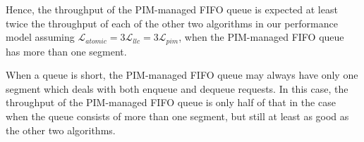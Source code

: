 \documentclass[11pt]{article}
\newcommand{\latpim} {\mathcal{L}_{pim}}
\newcommand{\latllc} {\mathcal{L}_{llc}}
\newcommand{\latato} {\mathcal{L}_{atomic}}
\begin{document}
Hence, the throughput of the PIM-managed FIFO queue is expected at least twice the throughput of each of 
the other two algorithms in our performance model assuming $\latato = 3\latllc = 3\latpim$, 
when the PIM-managed FIFO queue has more than one segment. 

When a queue is short, the PIM-managed FIFO queue may always have only one segment 
which deals with both enqueue and dequeue requests. 
In this case, the throughput of the PIM-managed FIFO queue is only half of that in the case when 
the queue consists of more than one segment, but still at least as good as the other two algorithms. 




\end{document}
